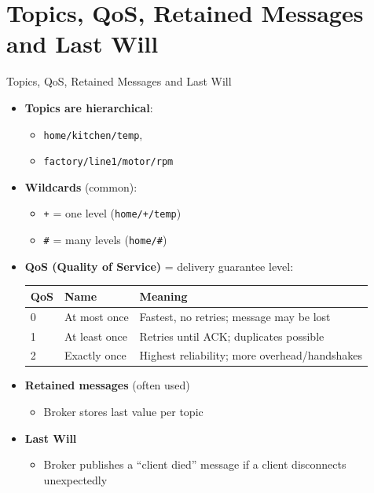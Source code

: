 ﻿\section{Topics, QoS, Retained Messages and Last Will}

\begin{frame}{Topics, QoS, Retained Messages and Last Will}
  \begin{itemize}
    \item \textbf{Topics are hierarchical}:
	\begin{itemize}
		\item \texttt{home/kitchen/temp},
		\item \texttt{factory/line1/motor/rpm}
	\end{itemize}
    \item \textbf{Wildcards} (common):
	\begin{itemize}
      \item \texttt{+} = one level (\texttt{home/+/temp})
      \item \texttt{\#} = many levels (\texttt{home/\#})
	\end{itemize}
    \item \textbf{QoS (Quality of Service)} = delivery guarantee level:

  \vspace{0.5ex}
  \begin{tabular}{lll}
    \toprule
    \textbf{QoS} & \textbf{Name} & \textbf{Meaning} \\
    \midrule
    0 & At most once  & Fastest, no retries; message may be lost \\
    1 & At least once & Retries until ACK; duplicates possible \\
    2 & Exactly once  & Highest reliability; more overhead/handshakes \\
    \bottomrule
  \end{tabular}

  \vspace{0.5ex}
  \item \textbf{Retained messages} (often used)
  \begin{itemize}
    \item Broker stores last value per topic
  \end{itemize}

  \vspace{0.5ex}
  \item \textbf{Last Will}
  \begin{itemize}
    \item Broker publishes a “client died” message if a client disconnects unexpectedly
  \end{itemize}
  \end{itemize}
\end{frame}
